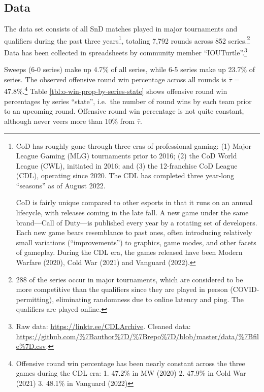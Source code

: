 \documentclass{article}
\begin{document}
\hypertarget{data}{%
\subsection{Data}\label{data}}

The data set consists of all SnD matches played in major tournaments and
qualifiers during the past three years\footnote{CoD has roughly gone
  through three eras of professional gaming: (1) Major League Gaming
  (MLG) tournaments prior to 2016; (2) the CoD World League (CWL),
  initiated in 2016; and (3) the 12-franchise CoD League (CDL),
  operating since 2020. The CDL has completed three year-long
  ``seasons'' as of August 2022.

  CoD is fairly unique compared to other esports in that it runs on an
  annual lifecycle, with releases coming in the late fall. A new game
  under the same brand---Call of Duty---is published every year by a
  rotating set of developers. Each new game bears resemblance to past
  ones, often introducing relatively small variations (``improvements'')
  to graphics, game modes, and other facets of gameplay. During the CDL
  era, the games released have been Modern Warfare (2020), Cold War
  (2021) and Vanguard (2022).}, totaling 7,792 rounds across 852
series.\footnote{288 of the series occur in major tournaments, which are
  considered to be more competitive than the qualifiers since they are
  played in person (COVID-permitting), eliminating randomness due to
  online latency and ping. The qualifiers are played online.} Data has
been collected in spreadsheets by community member
``IOUTurtle''.\footnote{Raw data: \url{https://linktr.ee/CDLArchive}.
  Cleaned data:
  \url{https://github.com/\%7Bauthor\%7D/\%7Brepo\%7D/blob/master/data/\%7Bfile\%7D.csv}.}

Sweeps (6-0 series) make up 4.7\% of all series, while 6-5 series make
up 23.7\% of series. The observed offensive round win percentage across
all rounds is \(\bar{\tau}\) = 47.8\%.\footnote{Offensive round win
  percentage has been nearly constant across the three games during the
  CDL era: 1. 47.2\% in MW (2020) 2. 47.9\% in Cold War (2021) 3. 48.1\%
  in Vanguard (2022)} Table \ref{tbl:o-win-prop-by-series-state} shows
offensive round win percentages by series ``state'', i.e.~the number of
round wins by each team prior to an upcoming round. Offensive round win
percentage is not quite constant, although never veers more than 10\%
from \(\bar{\tau}\).
\end{document}
